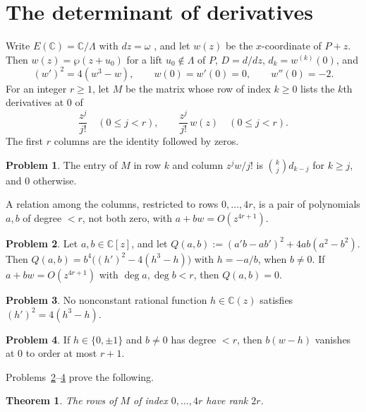 \documentclass[reqno]{amsart}
\theoremstyle{definition}
\newtheorem{problem}{Problem}[section]
\theoremstyle{plain}
\newtheorem{theorem}{Theorem}[section]
\newcommand{\C}{\mathbb{C}}
\begin{document}
\section{The determinant of derivatives}\label{sec:determinant}

Write \(E(\C) = \C/\Lambda\) with \(dz = \omega\) \cite[Ch.~VI]{Si1}, and let \(w(z)\) be the \(x\)-coordinate of \(P + z\).  Then \(w(z) = \wp(z + u_0)\) for a lift \(u_0 \notin \Lambda\) of \(P\), \(D = d/dz\), \(d_k = w^{(k)}(0)\), and
\[
  (w')^2 = 4(w^3 - w), \qquad w(0) = w'(0) = 0, \qquad w''(0) = -2.
\]
For an integer \(r \ge 1\), let \(M\) be the matrix whose row of index \(k \ge 0\) lists the \(k\)th derivatives at \(0\) of
\begin{equation}\label{eq:columns}
  \frac{z^j}{j!} \quad (0 \le j < r), \qquad \frac{z^j}{j!}\, w(z) \quad (0 \le j < r).
\end{equation}
The first \(r\) columns are the identity followed by zeros.

\begin{problem}\label{pr:entries}
The entry of \(M\) in row \(k\) and column \(z^j w/j!\) is \(\binom kj d_{k - j}\) for \(k \ge j\), and \(0\) otherwise.
\end{problem}

A relation among the columns, restricted to rows \(0, \dots, 4r\), is a pair of polynomials \(a, b\) of degree \(< r\), not both zero, with \(a + bw = O(z^{4r+1})\).

\begin{problem}\label{pr:Q}
Let \(a, b \in \C[z]\), and let \(Q(a, b) := (a'b - ab')^2 + 4ab(a^2 - b^2)\).  Then \(Q(a, b) = b^4\bigl((h')^2 - 4(h^3 - h)\bigr)\) with \(h = -a/b\), when \(b \ne 0\).  If \(a + bw = O(z^{4r+1})\) with \(\deg a, \deg b < r\), then \(Q(a, b) = 0\).
\end{problem}

\begin{problem}\label{pr:no-rational}
No nonconstant rational function \(h \in \C(z)\) satisfies \((h')^2 = 4(h^3 - h)\).
\end{problem}

\begin{problem}\label{pr:constant}
If \(h \in \{0, \pm1\}\) and \(b \ne 0\) has degree \(< r\), then \(b(w - h)\) vanishes at \(0\) to order at most \(r + 1\).
\end{problem}

Problems~\ref{pr:Q}--\ref{pr:constant} prove the following.

\begin{theorem}\label{thm:rank}
The rows of \(M\) of index \(0, \dots, 4r\) have rank \(2r\).
\end{theorem}
\end{document}
